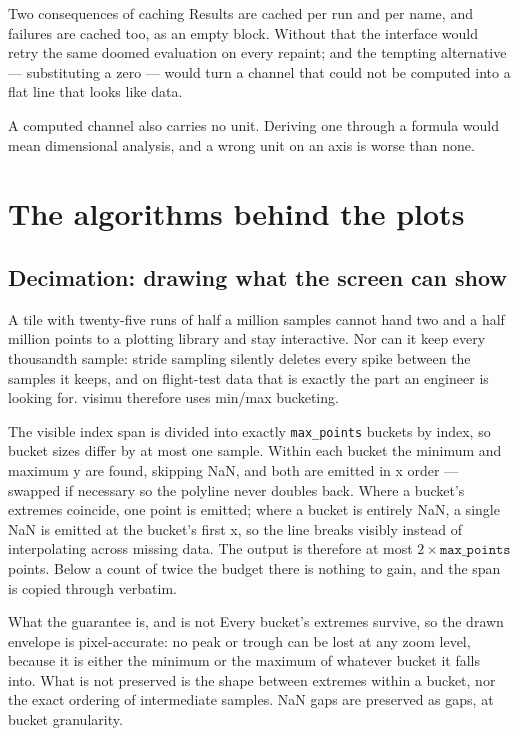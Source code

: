 \documentclass[11pt,a4paper,oneside]{report}
\newcommand{\code}[1]{\texttt{#1}}
\begin{document}
\begin{aoenote}{Two consequences of caching}
Results are cached per run and per name, and failures are cached too, as an
empty block. Without that the interface would retry the same doomed evaluation on
every repaint; and the tempting alternative --- substituting a zero --- would
turn a channel that could not be computed into a flat line that looks like data.

A computed channel also carries no unit. Deriving one through a formula would
mean dimensional analysis, and a wrong unit on an axis is worse than none.
\end{aoenote}

\chapter{The algorithms behind the plots}
\label{ch:algorithms}

\section{Decimation: drawing what the screen can show}

A tile with twenty-five runs of half a million samples cannot hand two and a
half million points to a plotting library and stay interactive. Nor can it keep
every thousandth sample: stride sampling silently deletes every spike between
the samples it keeps, and on flight-test data that is exactly the part an
engineer is looking for. visimu therefore uses min/max bucketing.

The visible index span is divided into exactly \code{max\_points} buckets by
index, so bucket sizes differ by at most one sample. Within each bucket the
minimum and maximum y are found, skipping NaN, and both are emitted in x order
--- swapped if necessary so the polyline never doubles back. Where a bucket's
extremes coincide, one point is emitted; where a bucket is entirely NaN, a
single NaN is emitted at the bucket's first x, so the line breaks visibly
instead of interpolating across missing data. The output is therefore at most
$2 \times \code{max\_points}$ points. Below a count of twice the budget there is
nothing to gain, and the span is copied through verbatim.

\begin{aoenote}{What the guarantee is, and is not}
Every bucket's extremes survive, so the drawn envelope is pixel-accurate: no
peak or trough can be lost at any zoom level, because it is either the minimum
or the maximum of whatever bucket it falls into. What is not preserved is the
shape between extremes within a bucket, nor the exact ordering of intermediate
samples. NaN gaps are preserved as gaps, at bucket granularity.
\end{aoenote}
\end{document}
